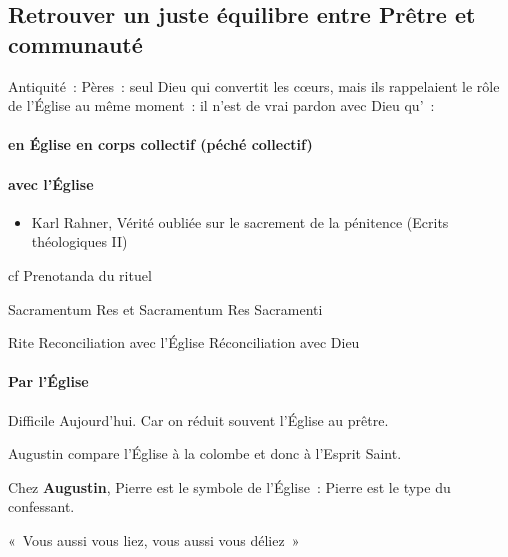 \hypertarget{retrouver-un-juste-uxe9quilibre-entre-pruxeatre-et-communautuxe9}{%
\subsection{Retrouver un juste équilibre entre Prêtre et
communauté}\label{retrouver-un-juste-uxe9quilibre-entre-pruxeatre-et-communautuxe9}}

Antiquité~: Pères~: seul Dieu qui convertit les cœurs, mais ils
rappelaient le rôle de l'Église au même moment~: il n'est de vrai pardon
avec Dieu qu'~:

\hypertarget{en-uxe9glise-en-corps-collectif-puxe9chuxe9-collectif}{%
\paragraph{en Église en corps collectif (péché
collectif)}\label{en-uxe9glise-en-corps-collectif-puxe9chuxe9-collectif}}

\hypertarget{avec-luxe9glise}{%
\paragraph{\texorpdfstring{avec l'Église
}{avec l'Église }}\label{avec-luxe9glise}}

\begin{itemize}
\item
  Karl Rahner, Vérité oubliée sur le sacrement de la pénitence (Ecrits
  théologiques II)
\end{itemize}

cf Prenotanda du rituel

Sacramentum Res et Sacramentum Res Sacramenti

Rite Reconciliation avec l'Église Réconciliation avec Dieu

\hypertarget{par-luxe9glise}{%
\paragraph{\texorpdfstring{Par l'Église
}{Par l'Église }}\label{par-luxe9glise}}

Difficile Aujourd'hui. Car on réduit souvent l'Église au prêtre.

Augustin compare l'Église à la colombe et donc à l'Esprit Saint.

Chez \textbf{Augustin}, Pierre est le symbole de l'Église~: Pierre est
le type du confessant.

«~Vous aussi vous liez, vous aussi vous déliez~»

